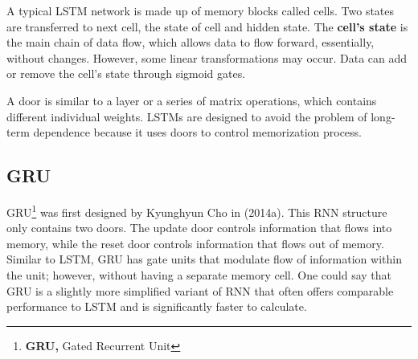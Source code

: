 A typical LSTM network is made up of memory blocks called cells. Two states are transferred to next cell, the state of cell and hidden state. The \textbf{cell's state} is the main chain of data flow, which allows data to flow forward, essentially, without changes. However, some linear transformations may occur. Data can add or remove the cell's state through sigmoid gates.

\vspace{5mm} %

A door is similar to a layer or a series of matrix operations, which contains different individual weights. LSTMs are designed to avoid the problem of long-term dependence because it uses doors to control memorization process.

\subsection{GRU}

GRU\footnote{\textbf{GRU, }Gated Recurrent Unit} was first designed by Kyunghyun Cho in (2014a). This RNN structure only contains two doors. The update door controls information that flows into memory, while the reset door controls information that flows out of memory. Similar to LSTM, GRU has gate units that modulate flow of information within the unit; however, without having a separate memory cell. One could say that GRU is a slightly more simplified variant of RNN that often offers comparable performance to LSTM and is significantly faster to calculate.

